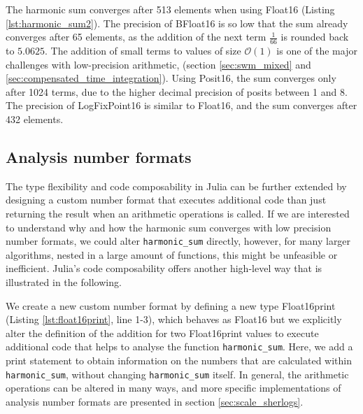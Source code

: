 The harmonic sum converges after 513 elements when using Float16 (Listing \ref{lst:harmonic_sum2}). The precision of BFloat16
is so low that the sum already converges after 65 elements, as the addition of the next term $\tfrac{1}{66}$ is rounded back to
$5.0625$. The addition of small terms to values of size $\mathcal{O}(1)$ is one of the major challenges with low-precision arithmetic,
(section \ref{sec:swm_mixed} and \ref{sec:compensated_time_integration}). Using Posit16, the sum converges only after 1024 terms,
due to the higher decimal precision of posits between 1 and 8. The precision of LogFixPoint16 is similar to Float16, and the sum
converges after 432 elements.

\subsection{Analysis number formats}
\label{sec:analysis_number_formats}

The type flexibility and code composability in Julia can be further extended by designing a custom number format that executes
additional code than just returning the result when an arithmetic operations is called. If we are interested to understand why and
how the harmonic sum converges with low precision number formats, we could alter \texttt{harmonic\_sum} directly, however,
for many larger algorithms, nested in a large amount of functions, this might be unfeasible or inefficient. Julia's code
composability offers another high-level way that is illustrated in the following.

We create a new custom number format by defining a new type Float16print (Listing \ref{lst:float16print}, line 1-3), which behaves as Float16
but we explicitly alter the definition of the addition for two Float16print values to execute additional code that helps to analyse the
function \texttt{harmonic\_sum}. Here, we add a print statement to obtain information on the numbers that are calculated within 
\texttt{harmonic\_sum}, without changing \texttt{harmonic\_sum} itself. In general, the arithmetic operations can be altered in many ways,
and more specific implementations of analysis number formats are presented in section \ref{sec:scale_sherlogs}.

